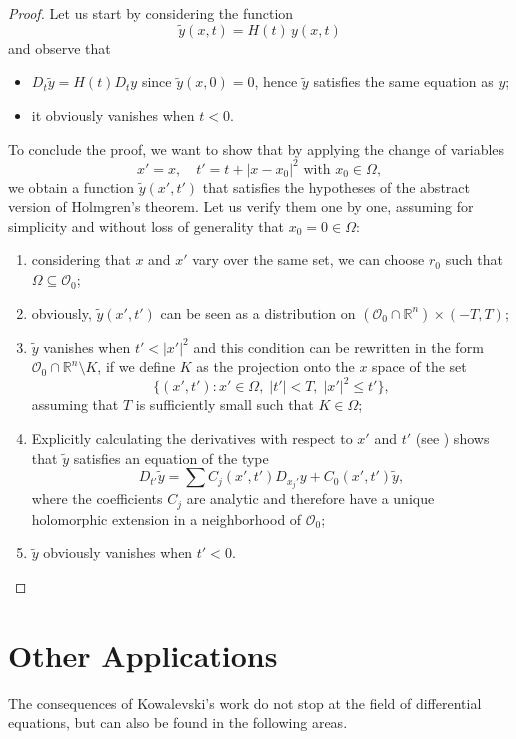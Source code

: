 \begin{proof}
Let us start by considering the function $$\widetilde{y}(x,t) = H(t) \, y(x,t)$$
and observe that
\begin{itemize}
\item $D_t \widetilde{y} = H(t) D_t y$ since $\widetilde{y}(x,0)=0$, hence $\widetilde{y}$ satisfies the same equation as $y$;
\item it obviously vanishes when $t<0$.
\end{itemize}
To conclude the proof, we want to show that by applying the change of variables 
$$x'=x, \quad t'=t+|x-x_0|^2 \text{ with } x_0\in \Omega ,$$
we obtain a function $\widetilde{y}(x',t')$ that satisfies the hypotheses of the abstract version of Holmgren's theorem. Let us verify them one by one, assuming for simplicity and without loss of generality that $x_0=0\in\Omega$:
\begin{enumerate}
\item considering that $x$ and $x'$ vary over the same set, we can choose $r_0$ such that $\Omega \subseteq \mathcal{O}_0$;
\item obviously, $\widetilde{y}(x',t')$ can be seen as a distribution on ${(\mathcal{O}_0 \cap \mathbb{R}^n) \times (-T,T)}$;
\item $\widetilde{y}$ vanishes when $t'<|x'|^2$ and this condition can be rewritten in the form ${\mathcal{O}_0 \cap \mathbb{R}^n \setminus K}$, if we define $K$ as the projection onto the $x$ space of the set
$$\{(x',t'): x'\in\Omega,\; |t'|<T,\; |x'|^2\leq t' \},$$
assuming that $T$ is sufficiently small such that $K\in\Omega$;
\item Explicitly calculating the derivatives with respect to $x'$ and $t'$ (see \cite[cap.21]{Treves}) shows that $\widetilde{y}$ satisfies an equation of the type
$$D_{t'} \widetilde{y} = \sum C_j (x',t') D_{x_j'}y+C_0(x',t')\widetilde{y},$$ 
where the coefficients $C_j$ are analytic and therefore have a unique holomorphic extension in a neighborhood of $\mathcal{O}_0$;
\item $\widetilde{y}$ obviously vanishes when $t'<0$.
\end{enumerate}
\end{proof}

\newpage
\section{Other Applications}

The consequences of Kowalevski's work do not stop at the field of differential equations, but can also be found in the following areas.

